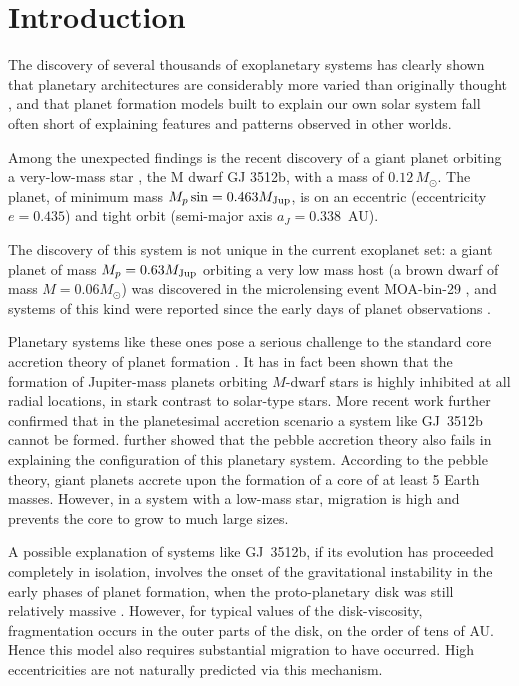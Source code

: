 \documentclass[twocolumn]{aastex62}
\begin{document}
\section{Introduction}

The discovery of several thousands of exoplanetary systems
has clearly shown that planetary architectures are
considerably more varied than originally thought \citep{Bathala2013}, and
that planet formation models built to explain our
own solar system fall often short of explaining
features and patterns observed in other worlds.

Among the unexpected findings is the recent
discovery of a giant planet orbiting a very-low-mass
star \citep{Morales2019}, the M dwarf GJ 3512b, with a mass of $0.12\,M_\odot$.
The planet, of minimum mass $M_p\sin =0.463M_{\rm Jup}$, 
is on an eccentric (eccentricity $e=0.435$) and
tight orbit (semi-major axis $a_J=0.338$~AU).

The discovery of this system is not unique in the current exoplanet set: a giant planet of mass $M_p=0.63 M_{\rm Jup}$ 
orbiting a very low mass host (a brown dwarf of mass $M=0.06 M_\odot$) was discovered in the microlensing event MOA-bin-29 \citep{Kondo2019}, and systems of this kind were reported since the early days of planet observations \citep{Delfosse1998}.

Planetary systems like these ones pose a serious challenge to the standard core accretion theory of planet formation \citep{Mizuno1980,
Bodenheimer1986,
Laughlin2004}.
It has in fact been shown \citep{Laughlin2004} that the formation of Jupiter-mass planets orbiting $M$-dwarf stars is highly inhibited at all radial locations, in stark contrast to solar-type stars. 
More recent work \citep{Miguel2019} further confirmed that in the planetesimal accretion scenario a system like GJ~3512b cannot be formed.
\citet{Morales2019} further showed that the pebble accretion theory \citep{Johansen2019} also fails in explaining the configuration of this planetary  system. According to the pebble theory, giant planets accrete upon the formation of a core of at least 5 Earth masses. However, in a system with a low-mass star, migration is high and prevents the core to grow to much large sizes.

A possible explanation of systems like GJ~3512b, if its evolution has
proceeded completely in isolation, involves the onset of the
gravitational instability in the early phases of planet formation,
when the proto-planetary disk was still relatively massive
\citep{Lodato2005,Boss2006,Morales2019}. However, for typical values of the disk-viscosity,
fragmentation occurs in the outer parts of the disk, on the order of
tens of AU.  Hence this model also requires substantial migration to
have occurred. High eccentricities are not naturally predicted
via this mechanism.
\end{document}
